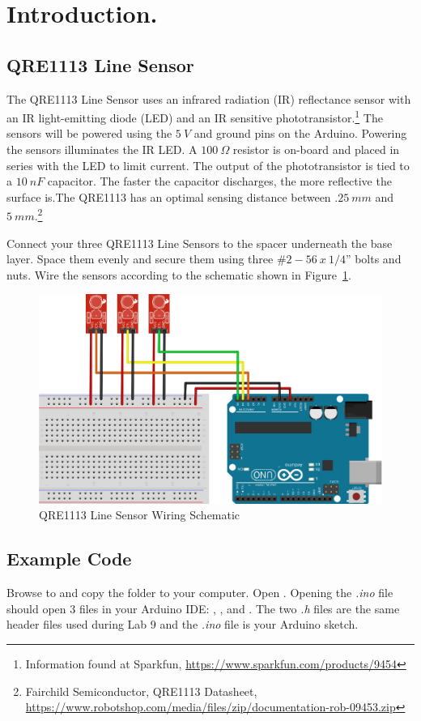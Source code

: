 \documentclass{handout}
\begin{document}
	\newpage
	\clearpage
	\pagebreak
	
	\section{Introduction.}
	
	\subsection{QRE1113 Line Sensor}
	The QRE1113 Line Sensor uses an infrared radiation (IR) reflectance sensor with an IR light-emitting diode (LED) and an IR sensitive phototransistor.\footnote{Information found at Sparkfun, \url{https://www.sparkfun.com/products/9454}} The sensors will be powered using the $5\ V$ and ground pins on the Arduino. Powering the sensors illuminates the IR LED. A $100\ \Omega$ resistor is on-board and placed in series with the LED to limit current. The output of the phototransistor is tied to a $10\ nF$ capacitor. The faster the capacitor discharges, the more reflective the surface is.\footnotemark[1] The QRE1113 has an optimal sensing distance between $.25\ mm$ and $5\ mm$.\footnote{Fairchild Semiconductor, QRE1113 Datasheet, \url{https://www.robotshop.com/media/files/zip/documentation-rob-09453.zip}}
	
	Connect your three QRE1113 Line Sensors to the spacer underneath the base layer. Space them evenly and secure them using three $\#2-56\ x\ 1/4”$ bolts and nuts. Wire the sensors according to the schematic shown in Figure~\ref{Fig Line}.
	
	\begin{figure} [H]
		\centering
		\includegraphics[width=.75\textwidth]{linefollowing.eps}
		\caption{QRE1113 Line Sensor Wiring Schematic}
		\label{Fig Line}
	\end{figure}
	
	\subsection{Example Code}
	Browse to  and copy the  folder to your computer. Open . Opening the \textit{.ino} file should open 3 files in your Arduino IDE: , , and . The two \textit{.h} files are the same header files used during Lab 9 and the \textit{.ino} file is your Arduino sketch.
	
\end{document}
